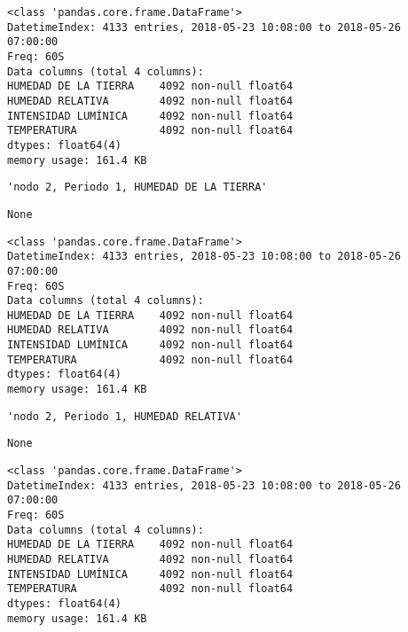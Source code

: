 \documentclass[11pt]{article}
\begin{document}
    \begin{Verbatim}[commandchars=\\\{\}]
<class 'pandas.core.frame.DataFrame'>
DatetimeIndex: 4133 entries, 2018-05-23 10:08:00 to 2018-05-26 07:00:00
Freq: 60S
Data columns (total 4 columns):
HUMEDAD DE LA TIERRA    4092 non-null float64
HUMEDAD RELATIVA        4092 non-null float64
INTENSIDAD LUMÍNICA     4092 non-null float64
TEMPERATURA             4092 non-null float64
dtypes: float64(4)
memory usage: 161.4 KB

    \end{Verbatim}

    
    \begin{verbatim}
'nodo 2, Periodo 1, HUMEDAD DE LA TIERRA'
    \end{verbatim}

    
    
    \begin{verbatim}
None
    \end{verbatim}

    
    \begin{Verbatim}[commandchars=\\\{\}]
<class 'pandas.core.frame.DataFrame'>
DatetimeIndex: 4133 entries, 2018-05-23 10:08:00 to 2018-05-26 07:00:00
Freq: 60S
Data columns (total 4 columns):
HUMEDAD DE LA TIERRA    4092 non-null float64
HUMEDAD RELATIVA        4092 non-null float64
INTENSIDAD LUMÍNICA     4092 non-null float64
TEMPERATURA             4092 non-null float64
dtypes: float64(4)
memory usage: 161.4 KB

    \end{Verbatim}

    
    \begin{verbatim}
'nodo 2, Periodo 1, HUMEDAD RELATIVA'
    \end{verbatim}

    
    
    \begin{verbatim}
None
    \end{verbatim}

    
    \begin{Verbatim}[commandchars=\\\{\}]
<class 'pandas.core.frame.DataFrame'>
DatetimeIndex: 4133 entries, 2018-05-23 10:08:00 to 2018-05-26 07:00:00
Freq: 60S
Data columns (total 4 columns):
HUMEDAD DE LA TIERRA    4092 non-null float64
HUMEDAD RELATIVA        4092 non-null float64
INTENSIDAD LUMÍNICA     4092 non-null float64
TEMPERATURA             4092 non-null float64
dtypes: float64(4)
memory usage: 161.4 KB

    \end{Verbatim}
\end{document}
